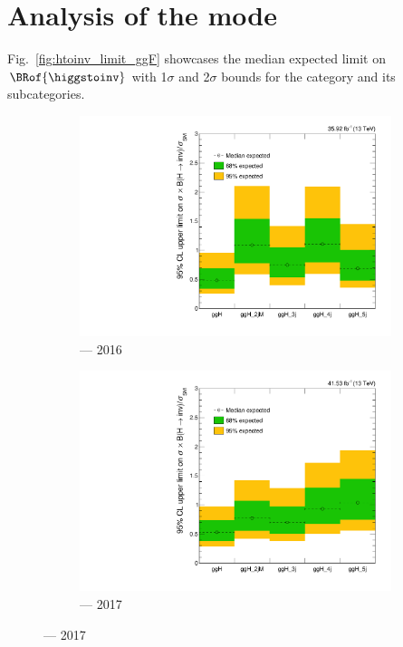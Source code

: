 

\section{Analysis of the \texorpdfstring{\ggH}{ggH} mode}
\label{sec:htoinv_analysis_ggF}


Fig.~\ref{fig:htoinv_limit_ggF} showcases the median expected limit on $\BRof{\higgstoinv}$ with 1$\sigma$ and 2$\sigma$ bounds for the \ggH category and its subcategories.

\begin{figure}[htbp]
    \centering
    \begin{subfigure}[b]{0.45\textwidth}
        \includegraphics[width=\textwidth]{figures/limits/ggF/limit_2016_ggF_Scenario5.pdf}
        \caption{\ggH --- 2016}
    \end{subfigure}
    \hfill
    \begin{subfigure}[b]{0.45\textwidth}
        \includegraphics[width=\textwidth]{figures/limits/ggF/limit_2017_ggF_Scenario5.pdf}
        \caption{\ggH --- 2017}
    \end{subfigure}


\end{figure}
